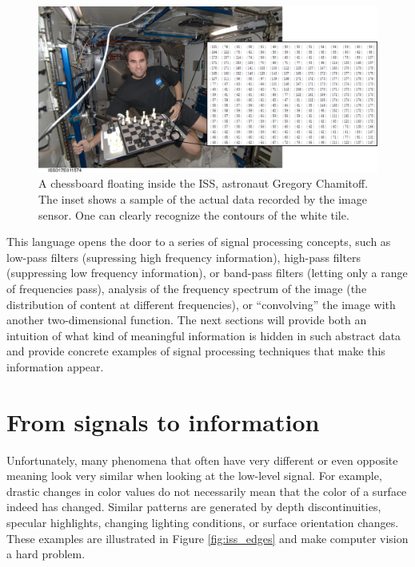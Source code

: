 \begin{figure}[!htb]
	\centering
		\includegraphics[width=\textwidth]{figs/iss_closeupmatrix}
	\caption{A chessboard floating inside the ISS, astronaut Gregory Chamitoff. The inset shows a sample of the actual data recorded by the image sensor. One can clearly recognize the contours of the white tile.}
	\label{fig:iss_closeup}
\end{figure}

This language opens the door to a series of signal processing concepts, such as low-pass filters (supressing high frequency information), high-pass filters (suppressing low frequency information), or band-pass filters (letting only a range of frequencies pass), analysis of the frequency spectrum of the image (the distribution of content at different frequencies), or ``convolving'' the image with another two-dimensional function. The next sections will provide both an intuition of what kind of meaningful information is hidden in such abstract data and provide concrete examples of signal processing techniques that make this information appear.

\section{From signals to information}
Unfortunately, many phenomena that often have very different or even opposite meaning look very similar when looking at the low-level signal. For example, drastic changes in color values do not necessarily mean that the color of a surface indeed has changed. Similar patterns are generated by depth discontinuities, specular highlights, changing lighting conditions, or surface orientation changes. These examples are illustrated in Figure \ref{fig:iss_edges} and make computer vision a hard problem.  

